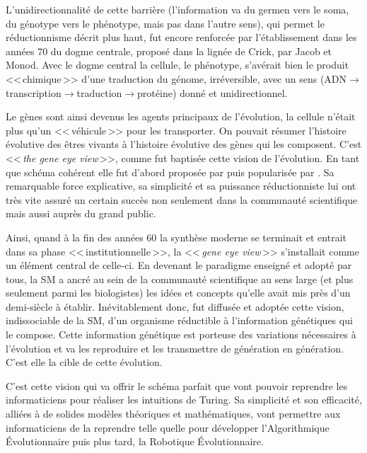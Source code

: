L'unidirectionnalité de cette barrière (l'information va du germen vers le soma, du génotype vers le phénotype, mais pas dans l'autre sens), qui permet le réductionnisme décrit plus haut, fut encore renforcée par l'établissement dans les années 70 du dogme centrale, proposé dans la lignée de Crick, par Jacob et Monod. Avec le dogme central la cellule, le phénotype, s'avérait bien le produit <<\,chimique\,>> d'une traduction du génome, irréversible, avec un sens (ADN$\rightarrow$transcription$\rightarrow$traduction$\rightarrow$protéine) donné et unidirectionnel.

Le gènes sont ainsi devenus les agents principaux de l'évolution, la cellule n'était plus qu'un <<\,véhicule\,>> \citep{dawkins76selfishgene} pour les transporter. On pouvait résumer l'histoire évolutive des êtres vivants à l'histoire évolutive des gènes qui les composent. C'est <<\,\emph{the gene eye view}\,>>, comme fut baptisée cette vision de l'évolution. En tant que schéma cohérent elle fut d'abord proposée par \cite{williams1966adaptationandnaturalselection} puis popularisée par \cite{dawkins76selfishgene}. Sa remarquable force explicative, sa simplicité et sa puissance réductionniste lui ont très vite assuré un certain succès non seulement dans la communauté scientifique mais aussi auprès du grand public.

Ainsi, quand à la fin des années 60 la synthèse moderne se terminait et entrait dans sa phase <<\,institutionnelle\,>>, la <<\,\emph{gene eye view}\,>> s'installait comme un élément central de celle-ci. En devenant le paradigme enseigné et adopté par tous, la SM a ancré au sein de la communauté scientifique au sens large (et plus seulement parmi les biologistes) les idées et concepts qu'elle avait mis près d'un demi-siècle à établir. Inévitablement donc, fut diffusée et adoptée cette vision, indissociable de la SM, d'un organisme réductible à l'information génétiques qui le compose. Cette information génétique est porteuse des variations nécessaires à l'évolution et va les reproduire et les transmettre de génération en génération. C'est elle la cible de cette évolution. 

C'est cette vision qui va offrir le schéma parfait que vont pouvoir reprendre les informaticiens pour réaliser les intuitions de Turing. Sa simplicité et son efficacité, alliées à de solides modèles théoriques et mathématiques, vont permettre aux informaticiens de la reprendre telle quelle pour développer l'Algorithmique Évolutionnaire puis plus tard, la Robotique \'Evolutionnaire. 

